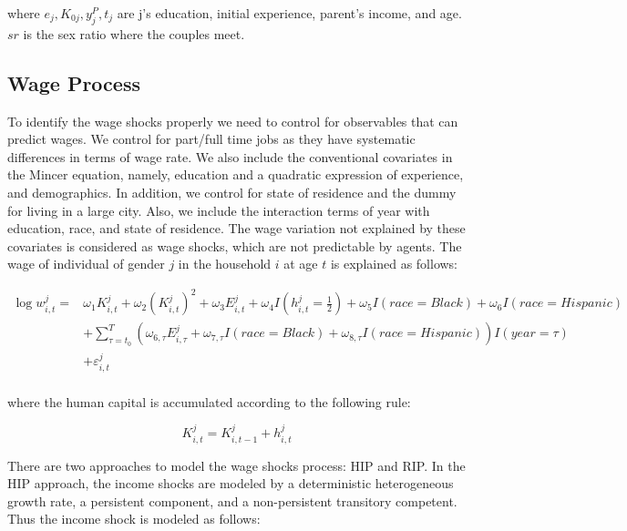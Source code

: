 where \( e_j, K_{0j}, y_j^P, t_j\) are j's education, initial experience, parent's income, and age. $sr$ is the sex ratio where the couples meet. \\

\subsection{Wage Process}

To identify the wage shocks properly we need to control for observables that can predict wages. We control for part/full time jobs as they have systematic differences in terms of wage rate. We also include the conventional covariates in the Mincer equation, namely, education and a quadratic expression of experience, and demographics. In addition, we control for state of residence and the dummy for living in a large city. Also, we include the interaction terms of year with education, race, and state of residence.  
 The wage variation not explained by these covariates is considered as wage shocks, which are not predictable by agents. The wage of individual of gender $j$ in the household $i$ at age $t$ is explained as follows: 

\begin{align*}
\log w_{i,t}^j = & \omega_1 K_{i,t}^j + \omega_2 (K_{i,t}^j)^2 + \omega_3 E_{i,t}^j + \omega_4 I(h_{i,t} ^j = \frac{1}{2}) +   \omega_5 I(race = Black) + \omega_6 I(race = Hispanic) \\
& + \sum \limits_{\tau =t_0}^{T}  \left ( \omega_{6,\tau} E_{i, \tau}^j + \omega_{7, \tau} I(race = Black) + \omega_{8, \tau} I(race = Hispanic) \right )I(year = \tau)  \\
& + \varepsilon^j_{i,t} \\
\end{align*}

where the human capital is accumulated according to the following rule:

\begin{equation*}
K_{i,t}^j = K_{i,t-1}^j + h_{i,t}^j
\end{equation*}


There are two approaches to model the wage shocks process: HIP and RIP. In the HIP approach, the income shocks are modeled by a deterministic heterogeneous growth rate, a persistent  component, and a non-persistent transitory competent. Thus the income shock is modeled as follows:

